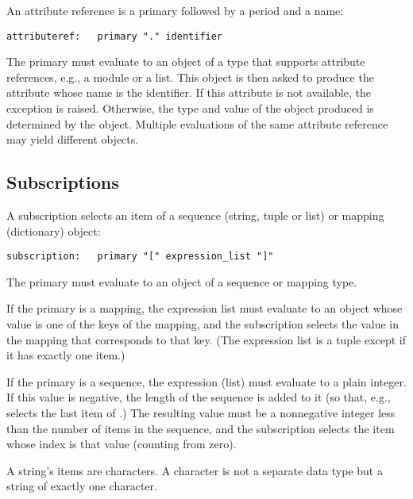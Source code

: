 An attribute reference is a primary followed by a period and a name:

\begin{verbatim}
attributeref:   primary "." identifier
\end{verbatim}

The primary must evaluate to an object of a type that supports
attribute references, e.g., a module or a list.  This object is then
asked to produce the attribute whose name is the identifier.  If this
attribute is not available, the exception
 is raised.
Otherwise, the type and value of the object produced is determined by
the object.  Multiple evaluations of the same attribute reference may
yield different objects.

\subsection{Subscriptions\label{subscriptions}}

A subscription selects an item of a sequence (string, tuple or list)
or mapping (dictionary) object:

\begin{verbatim}
subscription:   primary "[" expression_list "]"
\end{verbatim}

The primary must evaluate to an object of a sequence or mapping type.

If the primary is a mapping, the expression list must evaluate to an
object whose value is one of the keys of the mapping, and the
subscription selects the value in the mapping that corresponds to that
key.  (The expression list is a tuple except if it has exactly one
item.)

If the primary is a sequence, the expression (list) must evaluate to a
plain integer.  If this value is negative, the length of the sequence
is added to it (so that, e.g.,  selects the last item of
.)  The resulting value must be a nonnegative integer less
than the number of items in the sequence, and the subscription selects
the item whose index is that value (counting from zero).

A string's items are characters.  A character is not a separate data
type but a string of exactly one character.

